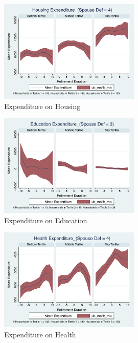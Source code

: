 \documentclass[11pt,onecolumn]{article}
\begin{document}
\clearpage

\begin{figure}[h]
	\caption{Expenditure on Housing}
	\centering
	\includegraphics[width=0.6\textwidth]{../ConsumptionPostRetirement_by_SpouseDef_Cats/Smoothed/4/spouse_def_total_housing_real.pdf}
\end{figure}


\begin{figure}[h]
	\caption{Expenditure on Education}
	\centering
	\includegraphics[width=0.6\textwidth]{../ConsumptionPostRetirement_by_SpouseDef_Cats/Smoothed/3/spouse_def_total_education_real.pdf}
\end{figure}
\clearpage

\begin{figure}[h]
	\caption{Expenditure on Health}
	\centering
	\includegraphics[width=0.6\textwidth]{../ConsumptionPostRetirement_by_SpouseDef_Cats/Smoothed/4/spouse_def_total_healthexpense_real.pdf}
\end{figure}
\end{document}
